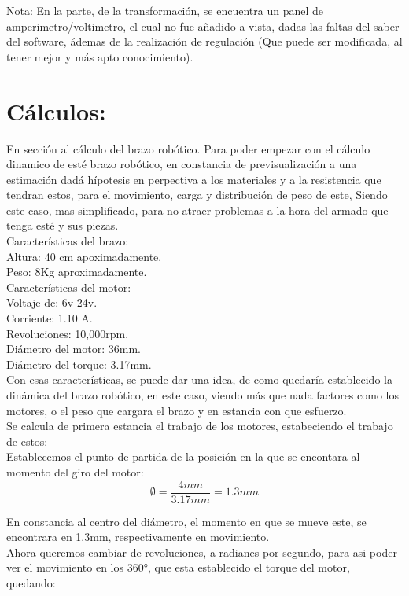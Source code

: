 \documentclass[14pt,a4paper]{article}
\begin{document}
Nota: En la parte, de la transformación, se encuentra un panel de amperimetro/voltimetro, el cual no fue añadido a vista, dadas las faltas del saber del software, ádemas de la realización de regulación (Que puede ser modificada, al tener mejor y más apto conocimiento).

\section{Cálculos:}
En sección al cálculo del brazo robótico. Para poder empezar con el cálculo dinamico de esté brazo robótico, en constancia de previsualización a una estimación dadá hípotesis en perpectiva a los materiales y a la resistencia que tendran estos, para el movimiento, carga y distribución de peso de este, Siendo este caso, mas simplificado, para no atraer problemas a la hora del armado que tenga esté y sus piezas.\\

Características del brazo:\\
Altura: 40 cm apoximadamente.\\
Peso: 8Kg aproximadamente.\\
Características del motor:\\
Voltaje dc: 6v-24v.\\
Corriente: 1.10 A.\\
Revoluciones: 10,000rpm.\\
Diámetro del motor: 36mm.\\
Diámetro del torque: 3.17mm.\\
Con esas características, se puede dar una idea, de como quedaría establecido la dinámica del brazo robótico, en este caso, viendo más que nada factores como los motores, o el peso que cargara el brazo y en estancia con que esfuerzo.\\
Se calcula de primera estancia el trabajo de los motores, estabeciendo el trabajo de estos:\\

Establecemos el punto de partida de la posición en la que se encontara al momento del giro del motor:\\

$$ \emptyset=\frac{4mm}{3.17mm}= 1.3mm $$

En constancia al centro del diámetro, el momento en que se mueve este, se encontrara en 1.3mm, respectivamente en movimiento.\\
Ahora queremos cambiar de revoluciones, a radianes por segundo, para asi poder ver el movimiento en los 360°, que esta establecido el torque del motor, quedando:\\
\end{document}
